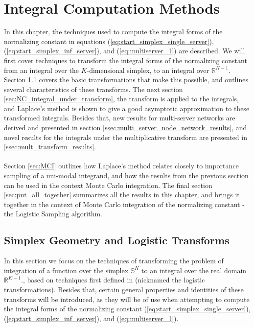 \chapter{Integral Computation Methods} \label{sec:Chapter4}

In this chapter, the techniques used to compute the integral forms of the normalizing constant in equations (\ref{eq:start_simplex_single_server}), (\ref{eq:start_simplex_inf_server}), and (\ref{eq:multiserver_1}) are described. We will first cover techniques to transform the integral forms of the normalizing constant from an integral over the \(K\)-dimensional simplex, to an integral over \(\mathbb{R}^{K-1}\). Section \ref{sec:logistic_transforms} covers the basic transformations that make this possible, and outlines several characteristics of these transforms. The next section \ref{sec:NC_integral_under_transform}, the transform is applied to the integrals, and Laplace's method is shown to give a good asymptotic approximation to these transformed integrals. Besides that, new results for multi-server networks are derived and presented in section \ref{ssec:multi_server_node_network_results}, and novel results for the integrals under the multiplicative transform are presented in \ref{ssec:mult_transform_results}.
\\\\
Section \ref{sec:MCI} outlines how Laplace's method relates closely to importance sampling of a uni-modal integrand, and how the results from the previous section can be used in the context Monte Carlo integration. The final section \ref{sec:put_all_together} summarizes all the results in this chapter, and brings it together in the context of Monte Carlo integration of the normalizing constant - the Logistic Sampling algorithm. 

\section{Simplex Geometry and Logistic Transforms}\label{sec:logistic_transforms}
In this section we focus on the techniques of transforming the problem of integration of a function over the simplex \(\mathbb{S}^K\) to an integral over the real domain \(\mathbb{R}^{K-1}\)., based on techniques first defined in \cite{Aitchison1982TheData} (nicknamed the logistic transformations). Besides that, certain general properties and identities of these transforms will be introduced, as they will be of use when attempting to compute the integral forms of the normalizing constant (\ref{eq:start_simplex_single_server}), (\ref{eq:start_simplex_inf_server}), and (\ref{eq:multiserver_1}). 

